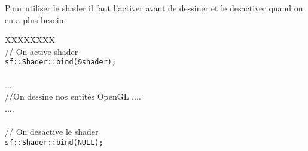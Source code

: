 Pour utiliser le shader il faut l'activer avant de dessiner et le desactiver quand on en a plus besoin.


\begin{tabbing}
XXXX\=XXXX\= \kill\\
\> // On active shader\\
\> \verb|sf::Shader::bind(&shader);|\\
\\
\> ....\\
\> //On dessine nos entités OpenGL ....\\
\> ....\\
\\
\> // On desactive le shader\\
\> \verb|sf::Shader::bind(NULL);|\\
\end{tabbing}


 